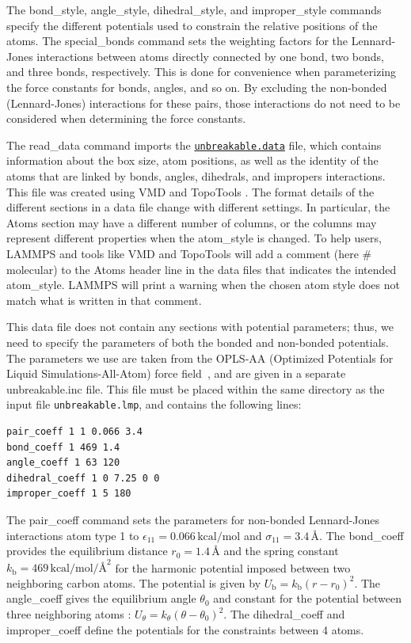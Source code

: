 \documentclass[9pt,tutorial]{livecoms}
\newcommand{\lmpcmd}[1]{\hspace{0pt}\colorbox{listing}{\textcolor{command}{\small{#1}}}\hspace{0pt}} %
\newcommand{\flecmd}[1]{\textcolor{command}{\texttt{#1}}} %
\newcommand{\dwlcmd}[1]{\textcolor{download}{\texttt{#1}}} %
\newcommand{\filepath}{https://raw.githubusercontent.com/lammpstutorials/lammpstutorials-article/main/files/}
\begin{document}
The \lmpcmd{bond\_style}, \lmpcmd{angle\_style},
\lmpcmd{dihedral\_style}, and \lmpcmd{improper\_style} commands specify
the different potentials used to constrain the relative positions of the
atoms.  The \lmpcmd{special\_bonds} command sets the weighting factors
for the Lennard-Jones interactions between atoms directly connected by
one bond, two bonds, and three bonds, respectively.  This is done for
convenience when parameterizing the force constants for bonds, angles, and
so on.  By excluding the non-bonded (Lennard-Jones) interactions for
these pairs, those interactions do not need to be considered when determining
the force constants.

The \lmpcmd{read\_data} command imports the
\href{\filepath tutorial2/unbreakable.data}{\dwlcmd{unbreakable.data}}
file, which contains information about the box
size, atom positions, as well as the identity of the atoms that are
linked by \lmpcmd{bonds}, \lmpcmd{angles}, \lmpcmd{dihedrals}, and
\lmpcmd{impropers} interactions.  This file was created using VMD and TopoTools
\cite{kohlmeyer2017topotools}.  The format details of the
different sections in a data file change with different settings.  In
particular, the \lmpcmd{Atoms} section may have a different number of
columns, or the columns may represent different properties when the
\lmpcmd{atom\_style} is changed.  To help users, LAMMPS and tools like
VMD and TopoTools will add a comment (here \lmpcmd{\# molecular}) to the
\lmpcmd{Atoms} header line in the data files that indicates the intended
\lmpcmd{atom\_style}.  LAMMPS will print a warning when the chosen atom
style does not match what is written in that comment.

This data file does not contain any sections with potential parameters; thus,
we need to specify the parameters of both the bonded and
non-bonded potentials.  The parameters we use are taken
from the OPLS-AA (Optimized Potentials for Liquid Simulations-All-Atom)
force field~\cite{jorgensenDevelopmentTestingOPLS1996}, and are given
in a separate \lmpcmd{unbreakable.inc} file.  This file must be placed within the same
directory as the input file \flecmd{unbreakable.lmp}, and contains the following lines:
\begin{lstlisting}
pair_coeff 1 1 0.066 3.4
bond_coeff 1 469 1.4
angle_coeff 1 63 120
dihedral_coeff 1 0 7.25 0 0
improper_coeff 1 5 180
\end{lstlisting}
The \lmpcmd{pair\_coeff} command sets the parameters for non-bonded
Lennard-Jones interactions atom type 1 to
$\epsilon_{11} = 0.066 \, \text{kcal/mol}$ and
$\sigma_{11} = 3.4 \, \text{\AA{}}$.  The \lmpcmd{bond\_coeff} provides
the equilibrium distance $r_0= 1.4 \, \text{\AA{}}$ and the
spring constant $k_\text{b} = 469 \, \text{kcal/mol/\AA{}}^2$ for the
harmonic potential imposed between two neighboring carbon atoms.  The potential
is given by $U_\text{b} = k_\text{b} ( r - r_0)^2$.  The
\lmpcmd{angle\_coeff} gives the equilibrium angle $\theta_0$ and
constant for the potential between three neighboring atoms :
$U_\theta = k_\theta ( \theta - \theta_0)^2$.  The
\lmpcmd{dihedral\_coeff} and \lmpcmd{improper\_coeff} define the potentials
for the constraints between 4 atoms.
\end{document}
